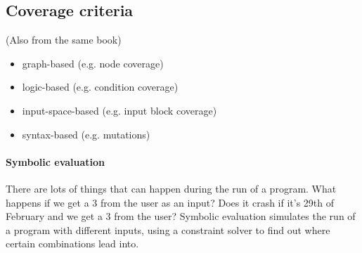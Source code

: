 
\subsection{Coverage criteria}

(Also from the same book)

\begin{itemize}
\item graph-based (e.g. node coverage)
\item logic-based (e.g. condition coverage)
\item input-space-based (e.g. input block coverage)
\item syntax-based (e.g. mutations)
\end{itemize}


\paragraph{Symbolic evaluation }

There are lots of things that can happen during the run of a
program. What happens if we get a 3 from the user as an input? Does it
crash if it's 29th of February and we get a 3 from the user?  Symbolic 
evaluation simulates the run of a program with different inputs, using 
a constraint solver to find out where certain combinations lead into.



